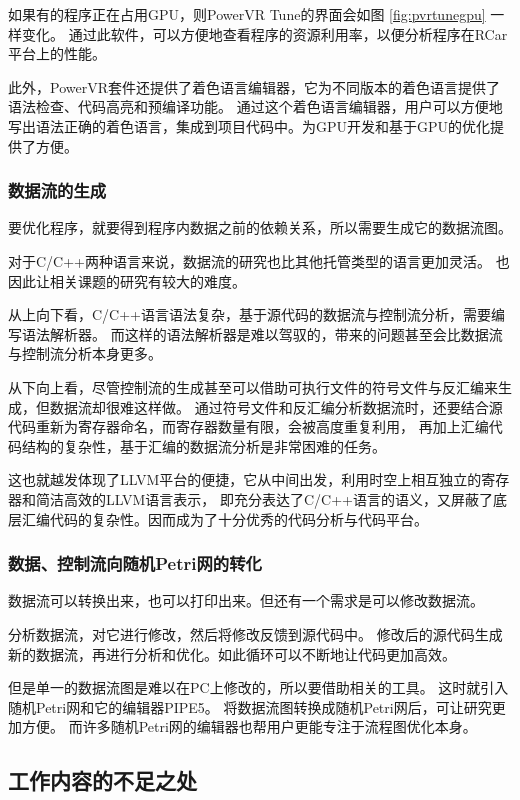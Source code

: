 如果有的程序正在占用GPU，则PowerVR Tune的界面会如图 \ref{fig:pvrtunegpu} 一样变化。
通过此软件，可以方便地查看程序的资源利用率，以便分析程序在RCar平台上的性能。

此外，PowerVR套件还提供了着色语言编辑器，它为不同版本的着色语言提供了语法检查、代码高亮和预编译功能。
通过这个着色语言编辑器，用户可以方便地写出语法正确的着色语言，集成到项目代码中。为GPU开发和基于GPU的优化提供了方便。

\subsubsection{数据流的生成}
要优化程序，就要得到程序内数据之前的依赖关系，所以需要生成它的数据流图。

对于C/C++两种语言来说，数据流的研究也比其他托管类型的语言更加灵活。
也因此让相关课题的研究有较大的难度。

从上向下看，C/C++语言语法复杂，基于源代码的数据流与控制流分析，需要编写语法解析器。
而这样的语法解析器是难以驾驭的，带来的问题甚至会比数据流与控制流分析本身更多。

从下向上看，尽管控制流的生成甚至可以借助可执行文件的符号文件与反汇编来生成，但数据流却很难这样做。
通过符号文件和反汇编分析数据流时，还要结合源代码重新为寄存器命名，而寄存器数量有限，会被高度重复利用，
再加上汇编代码结构的复杂性，基于汇编的数据流分析是非常困难的任务。

这也就越发体现了LLVM平台的便捷，它从中间出发，利用时空上相互独立的寄存器和简洁高效的LLVM语言表示，
即充分表达了C/C++语言的语义，又屏蔽了底层汇编代码的复杂性。因而成为了十分优秀的代码分析与代码平台。

\subsubsection{数据、控制流向随机Petri网的转化}
数据流可以转换出来，也可以打印出来。但还有一个需求是可以修改数据流。

分析数据流，对它进行修改，然后将修改反馈到源代码中。
修改后的源代码生成新的数据流，再进行分析和优化。如此循环可以不断地让代码更加高效。

但是单一的数据流图是难以在PC上修改的，所以要借助相关的工具。
这时就引入随机Petri网和它的编辑器PIPE5。
将数据流图转换成随机Petri网后，可让研究更加方便。
而许多随机Petri网的编辑器也帮用户更能专注于流程图优化本身。


\subsection{工作内容的不足之处}

